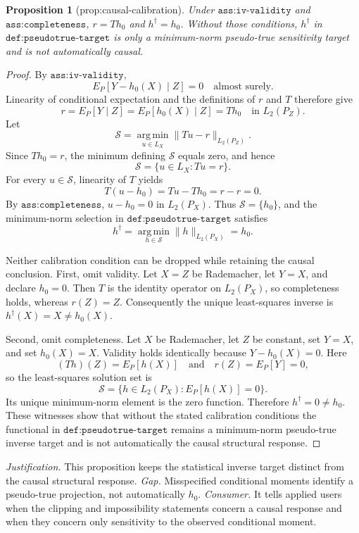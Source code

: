 \documentclass{article}
\newtheorem{proposition}{Proposition}
\begin{document}
\begin{proposition}[prop:causal-calibration]\label{prop:causal-calibration}
Under \(\texttt{ass:iv-validity}\) and \(\texttt{ass:completeness}\), \(r=Th_0\) and \(h^\dagger=h_0\). Without those conditions, \(h^\dagger\) in \(\texttt{def:pseudotrue-target}\) is only a minimum-norm pseudo-true sensitivity target and is not automatically causal.
\end{proposition}
\begin{proof}
By \(\texttt{ass:iv-validity}\),
\[
E_P[Y-h_0(X)\mid Z]=0
\quad\text{almost surely}.
\]
Linearity of conditional expectation and the definitions of \(r\) and \(T\) therefore give
\[
r=E_P[Y\mid Z]=E_P[h_0(X)\mid Z]=Th_0
\quad\text{in }L_2(P_Z).
\]
Let
\[
\mathcal S=\operatorname*{arg\,min}_{u\in L_X}\|Tu-r\|_{L_2(P_Z)}.
\]
Since \(Th_0=r\), the minimum defining \(\mathcal S\) equals zero, and hence
\[
\mathcal S=\{u\in L_X:Tu=r\}.
\]
For every \(u\in\mathcal S\), linearity of \(T\) yields
\[
T(u-h_0)=Tu-Th_0=r-r=0.
\]
By \(\texttt{ass:completeness}\), \(u-h_0=0\) in \(L_2(P_X)\). Thus \(\mathcal S=\{h_0\}\), and the minimum-norm selection in \(\texttt{def:pseudotrue-target}\) satisfies
\[
h^\dagger
=\operatorname*{arg\,min}_{h\in\mathcal S}\|h\|_{L_2(P_X)}
=h_0.
\]

Neither calibration condition can be dropped while retaining the causal conclusion. First, omit validity. Let \(X=Z\) be Rademacher, let \(Y=X\), and declare \(h_0=0\). Then \(T\) is the identity operator on \(L_2(P_X)\), so completeness holds, whereas \(r(Z)=Z\). Consequently the unique least-squares inverse is \(h^\dagger(X)=X\ne h_0(X)\).

Second, omit completeness. Let \(X\) be Rademacher, let \(Z\) be constant, set \(Y=X\), and set \(h_0(X)=X\). Validity holds identically because \(Y-h_0(X)=0\). Here
\[
(Th)(Z)=E_P[h(X)]
\quad\text{and}\quad
r(Z)=E_P[Y]=0,
\]
so the least-squares solution set is
\[
\mathcal S=\{h\in L_2(P_X):E_P[h(X)]=0\}.
\]
Its unique minimum-norm element is the zero function. Therefore \(h^\dagger=0\ne h_0\). These witnesses show that without the stated calibration conditions the functional in \(\texttt{def:pseudotrue-target}\) remains a minimum-norm pseudo-true inverse target and is not automatically the causal structural response.
\end{proof}
\par\smallskip\noindent \textit{Justification.} This proposition keeps the statistical inverse target distinct from the causal structural response. \textit{Gap.} Misspecified conditional moments identify a pseudo-true projection, not automatically \(h_0\). \textit{Consumer.} It tells applied users when the clipping and impossibility statements concern a causal response and when they concern only sensitivity to the observed conditional moment.
\end{document}
